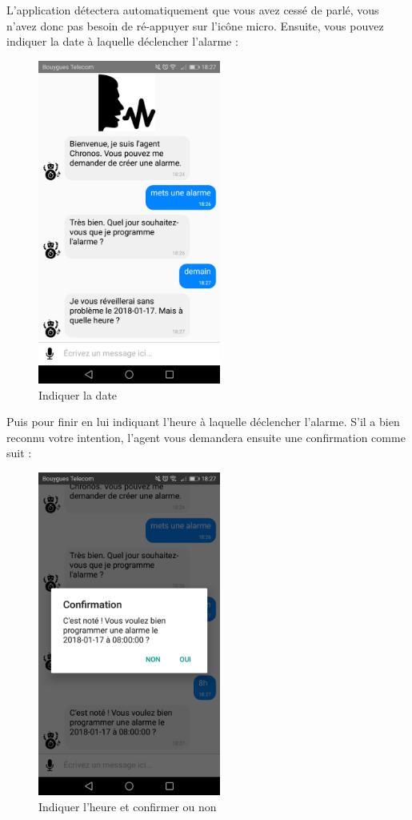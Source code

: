L'application détectera automatiquement que vous avez cessé de parlé, vous n'avez donc pas besoin de ré-appuyer sur l'icône micro.
Ensuite, vous pouvez indiquer la date à laquelle déclencher l'alarme :

\begin{figure}[H]
  \centering
  \includegraphics[width=6cm]{images/D.png}
  \caption{Indiquer la date}
\end{figure}

Puis pour finir en lui indiquant l'heure à laquelle déclencher l'alarme. S'il a bien reconnu votre intention, l'agent vous demandera ensuite une confirmation comme suit :

\begin{figure}[H]
  \centering
  \includegraphics[width=6cm]{images/E.png}
  \caption{Indiquer l'heure et confirmer ou non}
\end{figure}

